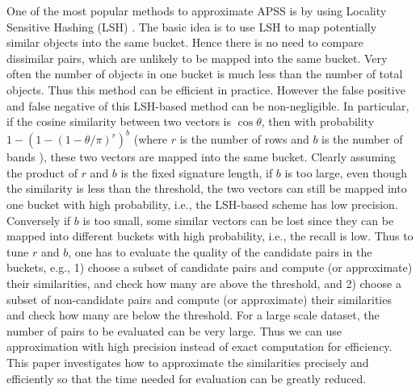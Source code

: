 \documentclass[sigconf,anonymous]{acmart}
\begin{document}
{\color{black}
One of the most popular methods to approximate APSS is by using Locality Sensitive Hashing (LSH) \cite{LRU14}. The basic idea is to use LSH to map potentially similar objects into the same bucket. Hence there is no need to compare dissimilar pairs, which are unlikely to be mapped into the same bucket. Very often the number of objects in one bucket is much less than the number of total objects. Thus this method can be efficient in practice. However the false positive and false negative of this LSH-based method can be non-negligible. In particular, if the cosine similarity between two vectors is $\cos \theta$, then with probability $1-(1-(1-\theta/\pi)^r)^b$ (where $r$ is the number of rows and $b$ is the number of bands \cite{LRU14}), these two vectors are mapped into the same bucket. Clearly assuming the product of $r$ and $b$ is the fixed signature length, if $b$ is too large, even though the similarity is less than the threshold, the two vectors can still be mapped into one bucket with high probability, i.e., the LSH-based scheme has low precision. Conversely if $b$ is too small, some similar vectors can be lost since they can be mapped into different buckets with high probability, i.e., the recall is low. Thus to tune $r$ and $b$, one has to evaluate the quality of the candidate pairs in the buckets, e.g., 1) choose a subset of candidate pairs and compute (or approximate) their similarities, and check how many are above the threshold, and 2) choose a subset of non-candidate pairs and compute (or approximate) their similarities and check how many are below the threshold. For a large scale dataset, the number of pairs to be evaluated can be very large. Thus we can use approximation with high precision instead of exact computation for efficiency. This paper investigates how to approximate the similarities precisely and efficiently so that the time needed for evaluation can be greatly reduced.
}
\end{document}
